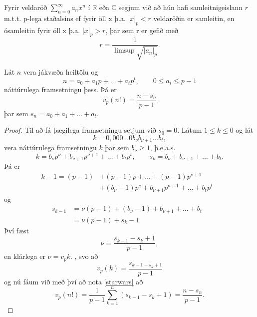 Fyrir veldaröð $\sum_{n=0}^{\infty} a_nx^n$ í $\mathbb{R}$ eða $\mathbb{C}$ segjum við að hún hafi samleitnigeislann $r$ 
m.t.t. p-lega staðalsins ef fyrir öll x þ.a. $|x|_p < r$ veldaröðin er samleitin, en ósamleitin fyrir öll x þ.a. $|x|_p > r$, 
þar sem r er gefið með
\begin{equation*}
r = \frac{1}{\limsup \sqrt{|a_n|_p }}.
\end{equation*} 


\begin{hjalparsetn}
Lát $n$ vera jákvæða heiltölu og 
\begin{equation*}
n = a_0 + a_1p+ \ldots + a_tp^t, \qquad 0\leq a_i \leq p - 1
\end{equation*}
náttúrulega framsetningu þess. Þá er
\begin{equation*}
v_p(n!) = \frac{n - s_n}{p-1}
\end{equation*}
þar sem $s_n = a_0 + a_1 + \ldots + a_t$.
\end{hjalparsetn}
\begin{proof}
Til að fá þægilega framsetningu setjum við $s_0 = 0$. Látum $1\leq k \leq 0$ og lát
\begin{equation*}
k = 0,0 0 0 \ldots 0 b_\nu b_{\nu + 1} \ldots b_t ,  
\end{equation*}
vera náttúrulega framsetningu $k$ þar sem $b_\nu \geq 1$, þ.e.a.s. 
\begin{equation*}
k = b_\nu p^\nu + b_{\nu +1} p^{\nu+1} + \ldots + b_t p^t, \qquad s_k = b_\nu + b_{\nu+1} + \ldots + b_t.
\end{equation*}
Þá er 
\begin{align*}
k-1 = (p-1) & + (p-1)p + \ldots + (p-1)p^{\nu +1} &\\
 & + (b_\nu -1)p^\nu + b_{\nu+1} p^{\nu +1} + \ldots + b_t p^t &
\end{align*}
og 
\begin{align*}
s_{k-1} &= \nu(p-1) + (b_\nu -1) + b_{\nu+1} + \ldots + b_t & \\
 &  = \nu(p-1) + s_k -1 &
\end{align*}
Því fæst
\begin{equation*}
\nu = \frac{s_{k-1}-s_k + 1}{p-1 },
\end{equation*}
en klárlega er $\nu = v_p k.$ , svo að
\begin{equation*}
v_p (k) = \frac{s_{k-1 - s_k +1}}{p-1}
\end{equation*}
og nú fáum við með því að nota \ref{starwars} að 
\begin{equation*}
v_p(n!) = \frac{1}{p-1} \sum_{k=1}^n (s_{k-1} - s_k +1) = \frac{n - s_n}{p-1}.
\end{equation*}
\end{proof}

